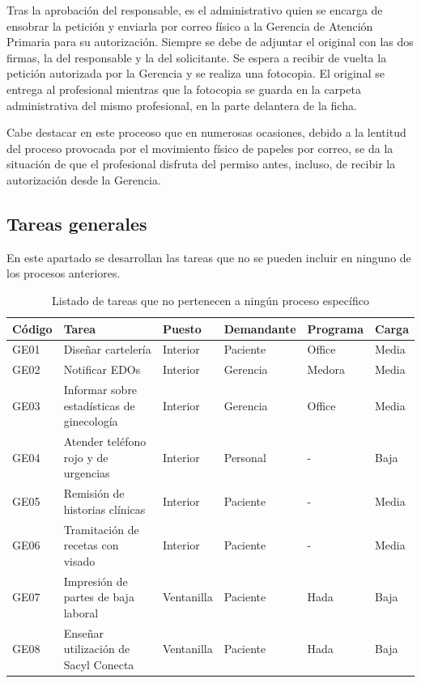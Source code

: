 Tras la aprobación del responsable, es el administrativo quien se encarga de ensobrar la petición y enviarla por correo físico a la Gerencia de Atención Primaria para su autorización.
Siempre se debe de adjuntar el original con las dos firmas, la del responsable y la del solicitante.
Se espera a recibir de vuelta la petición autorizada por la Gerencia y se realiza una fotocopia.
El original se entrega al profesional mientras que la fotocopia se guarda en la carpeta administrativa del mismo profesional, en la parte delantera de la ficha.

Cabe destacar en este proceoso que en numerosas ocasiones, debido a la lentitud del proceso provocada por el movimiento físico de papeles por correo, se da la situación de que el profesional disfruta del permiso antes, incluso, de recibir la autorización desde la Gerencia.

\subsection{Tareas generales}

En este apartado se desarrollan las tareas que no se pueden incluir en ninguno de los procesos anteriores.

\begin{table}[H]
    \begin{tabular}{lp{5cm}llll}
        \toprule
        Código & Tarea                                      & Puesto     & Demandante & Programa & Carga \\
        \midrule
        GE01   & Diseñar cartelería                         & Interior   & Paciente   & Office   & Media \\
        GE02   & Notificar EDOs                             & Interior   & Gerencia   & Medora   & Media \\
        GE03   & Informar sobre estadísticas de ginecología & Interior   & Gerencia   & Office   & Media \\
        GE04   & Atender teléfono rojo y de urgencias       & Interior   & Personal   & -        & Baja  \\
        GE05   & Remisión de historias clínicas             & Interior   & Paciente   & -        & Media \\
        GE06   & Tramitación de recetas con visado          & Interior   & Paciente   & -        & Media \\
        GE07   & Impresión de partes de baja laboral        & Ventanilla & Paciente   & Hada     & Baja  \\
        GE08   & Enseñar utilización de Sacyl Conecta       & Ventanilla & Paciente   & Hada     & Baja  \\
        \bottomrule
    \end{tabular}
    \caption{Listado de tareas que no pertenecen a ningún proceso específico}
    \label{tab:proceso-general}
\end{table}

